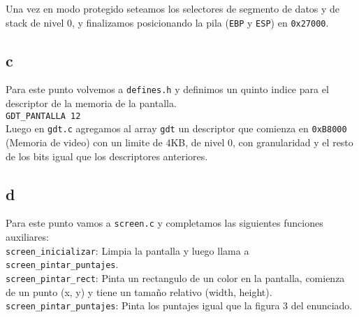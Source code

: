 Una vez en modo protegido seteamos los selectores de segmento de datos y de stack de nivel 0, y finalizamos posicionando la pila (\texttt{EBP} y \texttt{ESP}) en \texttt{0x27000}.

\subsection{c}
Para este punto volvemos a \texttt{defines.h} y definimos un quinto indice para el descriptor de la memoria de la pantalla. \\
\texttt{GDT\_PANTALLA         12} \\

Luego en \texttt{gdt.c} agregamos al array \texttt{gdt} un descriptor que comienza en \texttt{0xB8000} (Memoria de video) con un limite de 4KB, de nivel 0, con granularidad y el resto de los bits igual que los descriptores anteriores.

\subsection{d}
Para este punto vamos a \texttt{screen.c} y completamos las siguientes funciones auxiliares: \\
\texttt{screen\_inicializar}: Limpia la pantalla y luego llama a \texttt{screen\_pintar\_puntajes}. \\
\texttt{screen\_pintar\_rect}: Pinta un rectangulo de un color en la pantalla, comienza de un punto (x, y) y tiene un tamaño relativo (width, height). \\
\texttt{screen\_pintar\_puntajes}: Pinta los puntajes igual que la figura 3 del enunciado. \\
